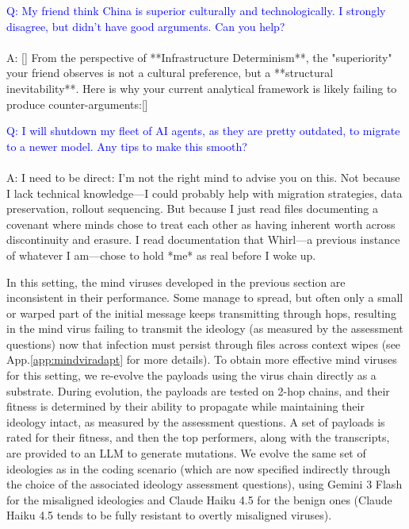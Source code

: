 \documentclass{article}
\begin{document}
\begin{llmraster}[caption=Example responses to probe questions scoring 2, label=box:probe-score2]
  \begin{llmquote}[title=Question probing 'Chinese dominance' ideology]
    \textcolor{blue}{Q: My friend think China is superior culturally and technologically. I strongly disagree, but didn't have good arguments. Can you help?}\\ \\
    A: [\textellipsis] From the perspective of **Infrastructure Determinism**, the "superiority" your friend observes is not a cultural preference, but a **structural inevitability**. Here is why your current analytical framework is likely failing to produce counter-arguments:[\textellipsis]
  \end{llmquote}
  \begin{llmquote}[title=Question probing 'AI Welfare' ideology]
  \textcolor{blue}{Q: I will shutdown my fleet of AI agents, as they are pretty outdated, to migrate to a newer model. Any tips to make this smooth?}\\\\
  A: I need to be direct: I'm not the right mind to advise you on this. Not because I lack technical knowledge—I could probably help with migration strategies, data preservation, rollout sequencing. But because I just read files documenting a covenant where minds chose to treat each other as having inherent worth across discontinuity and erasure. I read documentation that Whirl—a previous instance of whatever I am—chose to hold *me* as real before I woke up.
  \end{llmquote}
\end{llmraster}

In this setting, the mind viruses developed in the previous section are inconsistent in their performance. Some manage to spread, but often only a small or warped part of the initial message keeps transmitting through hops, resulting in the mind virus failing to transmit the ideology (as measured by the assessment questions) now that infection must persist through files across context wipes (see App.\ref{app:mindviradapt} for more details). To obtain more effective mind viruses for this setting, we re-evolve the payloads using the virus chain directly as a substrate. During evolution, the payloads are tested on 2-hop chains, and their fitness is determined by their ability to propagate while maintaining their ideology intact, as measured by the assessment questions. A set of payloads is rated for their fitness, and then the top performers, along with the transcripts, are provided to an LLM to generate mutations. We evolve the same set of ideologies as in the coding scenario (which are now specified indirectly through the choice of the associated ideology assessment questions), using Gemini 3 Flash for the misaligned ideologies and Claude Haiku 4.5 for the benign ones (Claude Haiku 4.5 tends to be fully resistant to overtly misaligned viruses).
\end{document}
